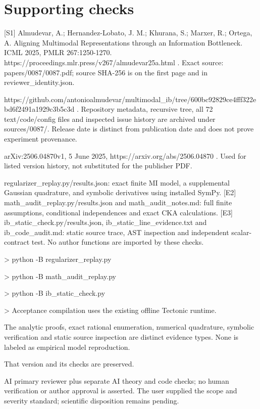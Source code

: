 \documentclass[10pt]{article}
\begin{document}
\section*{Supporting checks}
[S1] Almudevar, A.; Hernandez-Lobato, J. M.; Khurana, S.; Marxer, R.; Ortega, A. Aligning Multimodal Representations through an Information Bottleneck. ICML 2025, PMLR 267:1250-1270. https://proceedings.mlr.press/v267/almudevar25a.html . Exact source: papers/0087/0087.pdf; source SHA-256 is on the first page and in reviewer\_identity.json.\par
[S2] https://github.com/antonioalmudevar/multimodal\_ib/tree/600bc92829ce4fff322ebd6f2491a1929c3b5c3d . Repository metadata, recursive tree, all 72 text/code/config files and inspected issue history are archived under sources/0087/. Release date is distinct from publication date and does not prove experiment provenance.\par
[S3] arXiv:2506.04870v1, 5 June 2025, https://arxiv.org/abs/2506.04870 . Used for listed version history, not substituted for the publisher PDF.\par
[E1] regularizer\_replay.py/results.json: exact finite MI model, a supplemental Gaussian quadrature, and symbolic derivatives using installed SymPy. [E2] math\_audit\_replay.py/results.json and math\_audit\_notes.md: full finite assumptions, conditional independences and exact CKA calculations. [E3] ib\_static\_check.py/results.json, ib\_static\_line\_evidence.txt and ib\_code\_audit.md: static source trace, AST inspection and independent scalar-contract test. No author functions are imported by these checks.\par
> python -B regularizer\_replay.py\par
> python -B math\_audit\_replay.py\par
> python -B ib\_static\_check.py\par
> Acceptance compilation uses the existing offline Tectonic runtime.\par
The analytic proofs, exact rational enumeration, numerical quadrature, symbolic verification and static source inspection are distinct evidence types. None is labeled as empirical model reproduction.\par
That version and its checks are preserved.\par
AI primary reviewer plus separate AI theory and code checks; no human verification or author approval is asserted. The user supplied the scope and severity standard; scientific disposition remains pending.\par
\end{document}
